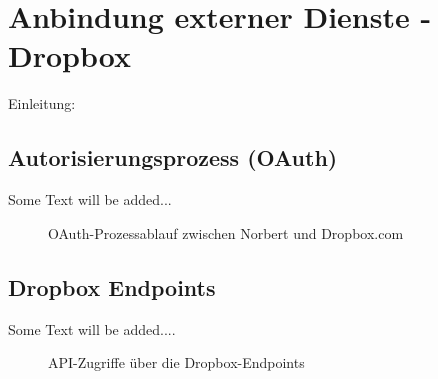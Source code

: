 

\chapter{Anbindung externer Dienste - Dropbox}

Einleitung: 


\section{Autorisierungsprozess (OAuth)}

Some Text will be added...

\begin{figure}[H]
\centering
	\scalebox{0.5}{}
	\caption{OAuth-Prozessablauf zwischen Norbert und Dropbox.com}
	\label{04ergebnis:oauth}	
\end{figure}


\section{Dropbox Endpoints}

Some Text will be added....

\begin{figure}[H]
\centering
	\scalebox{0.5}{}
	\caption{API-Zugriffe über die Dropbox-Endpoints}
	\label{04ergebnis:dpendpoints}	
\end{figure}